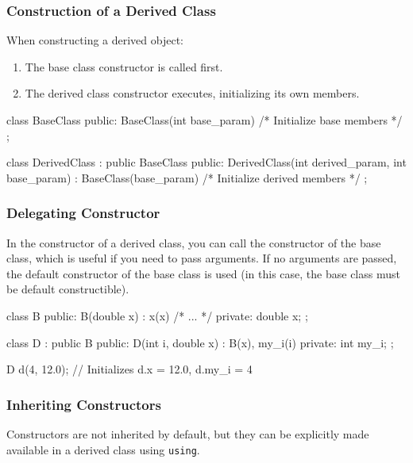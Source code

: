 \subsubsection{Construction of a Derived Class}

When constructing a derived object:

\begin{enumerate}
    \item The base class constructor is called first.
    \item The derived class constructor executes, initializing its own members.
\end{enumerate}

\begin{codeblock}[language=C++, numbers=none]
class BaseClass {
public:
    BaseClass(int base_param) { /* Initialize base members */ }
};

class DerivedClass : public BaseClass {
public:
    DerivedClass(int derived_param, int base_param) 
        : BaseClass(base_param) { /* Initialize derived members */ }
};
\end{codeblock}

\subsubsection{Delegating Constructor}

In the constructor of a derived class, you can call the constructor of the base class, which is useful if you need to pass arguments. If no arguments are passed, the default constructor of the base class is used (in this case, the base class must be default constructible).

\begin{codeblock}[language=C++]
class B {
public:
    B(double x) : x(x) { /* ... */ }
private:
    double x;
};

class D : public B {
public:
    D(int i, double x) : B(x), my_i(i) { }
private:
    int my_i;
};

D d(4, 12.0); // Initializes d.x = 12.0, d.my_i = 4
\end{codeblock}

\subsubsection{Inheriting Constructors}

Constructors are not inherited by default, but they can be explicitly made available in a derived class using \texttt{using}.

